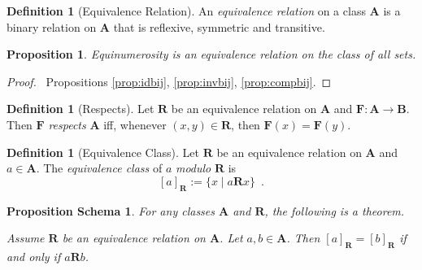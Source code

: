 \documentclass{book}
\let\qed\relax
\newtheorem{prop}[ax]{Proposition}
\newtheorem{props}[ax]{Proposition Schema}
\theoremstyle{definition}
\newtheorem{df}[ax]{Definition}
\begin{document}
\begin{df}[Equivalence Relation]
An \emph{equivalence relation} on a class $\mathbf{A}$ is a binary relation on $\mathbf{A}$ that is reflexive, symmetric and transitive.
\end{df}

\begin{prop}
Equinumerosity is an equivalence relation on the class of all sets.
\end{prop}

\begin{proof}
\pf\ Propositions \ref{prop:idbij}, \ref{prop:invbij}, \ref{prop:compbij}. \qed
\end{proof}

\begin{df}[Respects]
Let $\mathbf{R}$ be an equivalence relation on $\mathbf{A}$ and $\mathbf{F} : \mathbf{A} \rightarrow \mathbf{B}$. Then $\mathbf{F}$ \emph{respects} $\mathbf{A}$ iff, whenever $(x,y) \in \mathbf{R}$, then $\mathbf{F}(x) = \mathbf{F}(y)$.
\end{df}

\begin{df}[Equivalence Class]
Let $\mathbf{R}$ be an equivalence relation on $\mathbf{A}$ and $a \in \mathbf{A}$. The \emph{equivalence class} of $a$ \emph{modulo} $\mathbf{R}$ is
\[ [a]_{\mathbf{R}} := \{ x \mid a \mathbf{R} x \} \enspace . \]
\end{df}

\begin{props}
\label{prop:eqclassequal}
For any classes $\mathbf{A}$ and $\mathbf{R}$, the following is a theorem.

Assume $\mathbf{R}$ be an equivalence relation on $\mathbf{A}$. Let $a,b \in \mathbf{A}$. Then $[a]_\mathbf{R} = [b]_\mathbf{R}$ if and only if $a \mathbf{R} b$.
\end{props}
\end{document}
